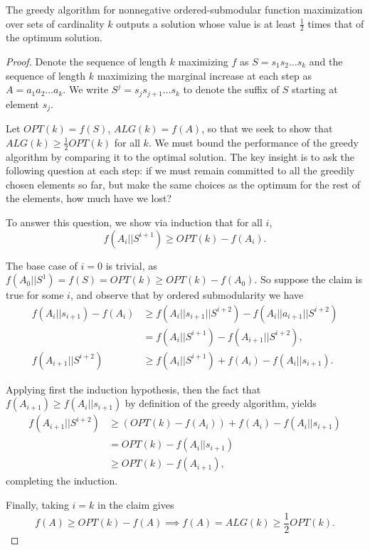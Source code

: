 \begin{prop}\label{prop:2approx}
   The greedy algorithm for nonnegative ordered-submodular function maximization over sets of cardinality $k$ outputs a solution whose value is at least $\frac{1}{2}$ times that of the optimum solution.
\end{prop}
\begin{proof}
    Denote the sequence of length $k$ maximizing $f$ as $S = s_1 s_2 \dots s_k$ and the sequence of length $k$ maximizing the marginal increase at each step as $A = a_1 a_2 \dots a_k$. We write $S^j = s_j s_{j+1} \dots s_k$ to denote the suffix of $S$ starting at element $s_j$.
    
    Let $OPT(k) = f(S)$, $ALG(k) = f(A)$, so that we seek to show that $ALG(k) \ge \frac{1}{2} OPT(k)$ for all $k$. We must bound the performance of the greedy algorithm by comparing it to the optimal solution. The key insight is to ask the following question at each step: if we must remain committed to all the greedily chosen elements so far, but make the same choices as the optimum for the rest of the elements, how much have we lost? 
    
    To answer this question, we show via induction that for all $i$, $$f(A_i || S^{i+1}) \ge OPT(k) - f(A_i).$$ 
    
    The base case of $i=0$ is trivial, as $f(A_0 || S^1) = f(S) = OPT(k) \ge OPT(k) - f(A_0)$. So suppose the claim is true for some $i$, and observe that by ordered submodularity we have 
    \begin{align*}
        f(A_i || s_{i+1}) - f(A_i) &\ge f(A_i || s_{i+1} || S^{i+2}) - f(A_i || a_{i+1} || S^{i+2}) \\
        &= f(A_i || S^{i+1}) - f(A_{i+1} || S^{i+2}), \\
        f(A_{i+1} || S^{i+2}) &\ge f(A_i || S^{i+1}) + f(A_i) - f(A_i || s_{i+1}).
    \end{align*}
    
    Applying first the induction hypothesis, then the fact that $f(A_{i+1}) \ge f(A_i || s_{i+1})$ by definition of the greedy algorithm, yields
    \begin{align*}
        f(A_{i+1} || S^{i+2}) &\ge (OPT(k) - f(A_i)) + f(A_i) - f(A_i || s_{i+1}) \\
        &= OPT(k) - f(A_i || s_{i+1}) \\
        &\ge OPT(k) - f(A_{i+1}),
    \end{align*}
    completing the induction.
    
    Finally, taking $i=k$ in the claim gives 
    $$f(A) \ge OPT(k) - f(A) \implies f(A) = ALG(k) \ge \frac{1}{2} OPT(k).$$
\end{proof}

% 